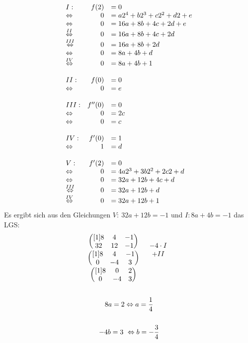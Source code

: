 \documentclass[main.tex]{subfiles}
\begin{document}
\begin{equation*}
\begin{array}{ l r l }
I: & f( 2) & =0\\
\Leftrightarrow  & 0 & =a2^{4} +b2^{3} +c2^{2} +d2+e\\
\Leftrightarrow  & 0 & =16a+8b+4c+2d+e\\
\overset{II}{\Leftrightarrow } & 0 & =16a+8b+4c+2d\\
\overset{III}{\Leftrightarrow } & 0 & =16a+8b+2d\\
\Leftrightarrow  & 0 & =8a+4b+d\\
\overset{IV}{\Leftrightarrow } & 0 & =8a+4b+1\\
 &  & \\
II: & f( 0) & =0\\
\Leftrightarrow  & 0 & =e\\
 &  & \\
III: & f''( 0) & =0\\
\Leftrightarrow  & 0 & =2c\\
\Leftrightarrow  & 0 & =c\\
 &  & \\
IV: & f'( 0) & =1\\
\Leftrightarrow  & 1 & =d\\
 &  & \\
V: & f'( 2) & =0\\
\Leftrightarrow  & 0 & =4a2^{3} +3b2^{2} +2c2+d\\
\Leftrightarrow  & 0 & =32a+12b+4c+d\\
\overset{III}{\Leftrightarrow } & 0 & =32a+12b+d\\
\overset{IV}{\Leftrightarrow } & 0 & =32a+12b+1
\end{array}
\end{equation*}
Es ergibt sich aus den Gleichungen $V:\ 32a+12b=-1$ und $I:8a+4b=-1$ das LGS:
\begin{gather*}
\begin{array}{ c c }
\begin{pmatrix}[1]
8 & 4 & -1\\
32 & 12 & -1
\end{pmatrix} & \begin{array}{ c }
 \\
-4\cdotp I
\end{array}\\
\begin{pmatrix}[1]
8 & 4 & -1\\
0 & -4 & 3
\end{pmatrix} & \begin{array}{ c }
+II\\
 \\
\end{array}\\
\begin{pmatrix}[1]
8 & 0 & 2\\
0 & -4 & 3
\end{pmatrix} & 
\end{array}\\
\\
8a=2\Leftrightarrow a=\frac{1}{4}\\
\\
-4b=3\ \Leftrightarrow b=-\frac{3}{4}
\end{gather*}
\end{document}
